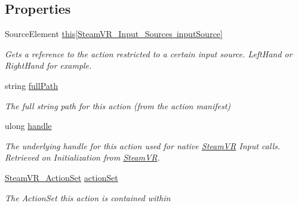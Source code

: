 \subsection*{Properties}
\begin{DoxyCompactItemize}
\item 
Source\+Element \mbox{\hyperlink{class_valve_1_1_v_r_1_1_steam_v_r___action___source___map_a71b9fc1c80b8d185d7f07833f18cadc5}{this\mbox{[}\+Steam\+V\+R\+\_\+\+Input\+\_\+\+Sources input\+Source\mbox{]}}}
\begin{DoxyCompactList}\small\item\em Gets a reference to the action restricted to a certain input source. Left\+Hand or Right\+Hand for example. \end{DoxyCompactList}\item 
string \mbox{\hyperlink{class_valve_1_1_v_r_1_1_steam_v_r___action___source___map_a720b5bdedf05f98826a8a9e12b8b9364}{full\+Path}}
\begin{DoxyCompactList}\small\item\em The full string path for this action (from the action manifest) \end{DoxyCompactList}\item 
ulong \mbox{\hyperlink{class_valve_1_1_v_r_1_1_steam_v_r___action___source___map_a6bc926f32341c260d49d8f270993adf0}{handle}}
\begin{DoxyCompactList}\small\item\em The underlying handle for this action used for native \mbox{\hyperlink{class_valve_1_1_v_r_1_1_steam_v_r}{Steam\+VR}} Input calls. Retrieved on Initialization from \mbox{\hyperlink{class_valve_1_1_v_r_1_1_steam_v_r}{Steam\+VR}}. \end{DoxyCompactList}\item 
\mbox{\hyperlink{class_valve_1_1_v_r_1_1_steam_v_r___action_set}{Steam\+V\+R\+\_\+\+Action\+Set}} \mbox{\hyperlink{class_valve_1_1_v_r_1_1_steam_v_r___action___source___map_a8a4f51dad7abd9b5b646ab3dc05f50ac}{action\+Set}}
\begin{DoxyCompactList}\small\item\em The Action\+Set this action is contained within \end{DoxyCompactList}\item 

\end{DoxyCompactItemize}
